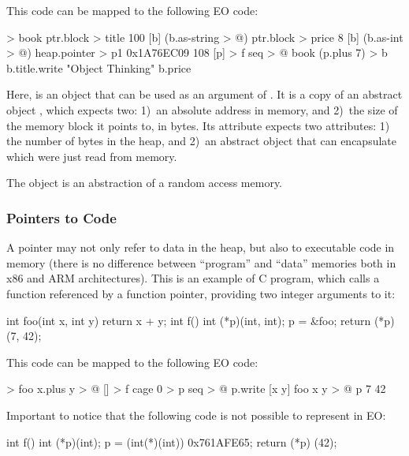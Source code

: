 \documentclass[sigplan,11pt,nonacm,natbib=false]{acmart}
\begin{document}
This code can be mapped to the following EO code:

\begin{ffcode}
[ptr] > book
  ptr.block > title
    100
    [b] (b.as-string > @)
  ptr.block > price
    8
    [b] (b.as-int > @)
heap.pointer > p1
  0x1A76EC09 
  108
[p] > f
  seq > @
    book (p.plus 7) > b
    b.title.write "Object Thinking"
    b.price    
\end{ffcode}

Here,  is an object that can be used as an argument of . It is a copy of an abstract object , which expects two: 1)~an absolute address in memory, and 2)~the size of the memory block it points to, in bytes. Its attribute  expects two attributes: 1) the number of bytes in the heap, and 2)~an abstract object that can encapsulate  which were just read from memory.

The object  is an abstraction of a random access memory.

\subsubsection{Pointers to Code}

A pointer may not only refer to data in the heap, but also to executable code in memory (there is no difference between ``program'' and ``data'' memories both in x86 and ARM architectures). This is an example of C program, which calls a function referenced by a function pointer, providing two integer arguments to it:

\begin{ffcode}
int foo(int x, int y) {
  return x + y;
}
int f() {
  int (*p)(int, int);
  p = &foo;
  return (*p) (7, 42);
}
\end{ffcode}

This code can be mapped to the following EO code:

\begin{ffcode}
[x y] > foo
  x.plus y > @
[] > f
  cage 0 > p
  seq > @
    p.write
      [x y]
        foo x y > @
    p 7 42
\end{ffcode}

Important to notice that the following code is not possible to represent in EO:

\begin{ffcode}
int f() {
  int (*p)(int);
  p = (int(*)(int)) 0x761AFE65;
  return (*p) (42);
}
\end{ffcode}
\end{document}
